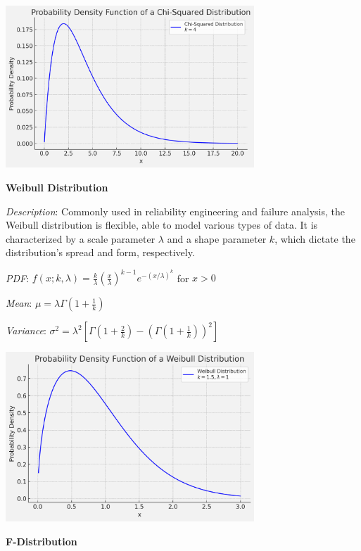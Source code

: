 \documentclass{article}
\begin{document}
\begin{multicols}{2}
\begin{mdframed}
      \begin{center}
        \includegraphics*[width=0.7\textwidth]{chisquared.png}
      \end{center}
\end{mdframed}
\begin{mdframed}
\textbf{Weibull Distribution}
        
\textit{Description}: Commonly used in reliability engineering and failure analysis, the Weibull distribution is flexible, able to model various types of data. It is characterized by a scale parameter $\lambda$ and a shape parameter $k$, which dictate the distribution's spread and form, respectively.
        
\textit{PDF}: $f(x; k, \lambda) = \frac{k}{\lambda}\left(\frac{x}{\lambda}\right)^{k-1}e^{-(x/\lambda)^k}$ for $x > 0$
        
  \textit{Mean}: $\mu = \lambda \Gamma\left(1 + \frac{1}{k}\right)$
        
  \textit{Variance}: $\sigma^2 = \lambda^2 \left[\Gamma\left(1 + \frac{2}{k}\right) - \left(\Gamma\left(1 + \frac{1}{k}\right)\right)^2\right]$
        
  \begin{center}
    \includegraphics*[width=0.7\textwidth]{weibull.png}
  \end{center}
\end{mdframed}
\begin{mdframed}
  \textbf{F-Distribution}
  

\end{mdframed}
\end{multicols}
\end{document}
